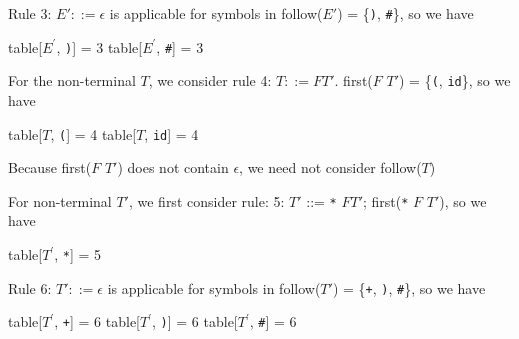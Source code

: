 \documentclass[8pt,a4paper,compress]{beamer}
\newcommand{\mm}[1]{$#1$}
\newcommand{\expo}[2]{$#1^{#2}$}
\newenvironment{spaced}
{
\smallskip
\hspace{.5cm}
\begin{minipage}[c]{\textwidth}
}
{
\end{minipage}
\smallskip
}
\begin{document}
\begin{frame}[fragile]
\pause

Rule 3: $E' ::= \epsilon$ is applicable for symbols in follow($E'$) =  \{\lstinline{)}, \lstinline{#}\}, so we have

\text{ }
\begin{spaced}
\begin{production}
table[\expo{E}{\prime}, \lstinline{)}] = 3
table[\expo{E}{\prime}, \lstinline{#}] = 3
\end{production}
\end{spaced}

\pause

For the non-terminal $T$, we consider rule 4: $T  ::= F T'$. first($F$ $T'$) = \{\lstinline{(}, \lstinline{id}\}, so we have

\text{ }
\begin{spaced}
\begin{production}
table[\mm{T}, \lstinline{(}] = 4
table[\mm{T}, \lstinline{id}] = 4
\end{production}
\end{spaced}

\pause

Because first($F$ $T'$) does not contain $\epsilon$, we need not consider follow($T$)

\pause
\bigskip

For non-terminal $T'$, we first consider rule: 5: $T'$ ::= \lstinline{*} $F T'$; first(\lstinline{*} $F$ $T'$), so we have

\text{ }
\begin{spaced}
\begin{production}
table[\expo{T}{\prime}, \lstinline{*}] = 5
\end{production}
\end{spaced}

\pause

Rule 6: $T' ::= \epsilon$ is applicable for symbols in follow($T'$) = \{\lstinline{+}, \lstinline{)}, \lstinline{#}\}, so we have

\text{ }
\begin{spaced}
\begin{production}
table[\expo{T}{\prime}, \lstinline{+}] = 6
table[\expo{T}{\prime}, \lstinline{)}] = 6
table[\expo{T}{\prime}, \lstinline{#}] = 6
\end{production}
\end{spaced}
\end{frame}
\end{document}
